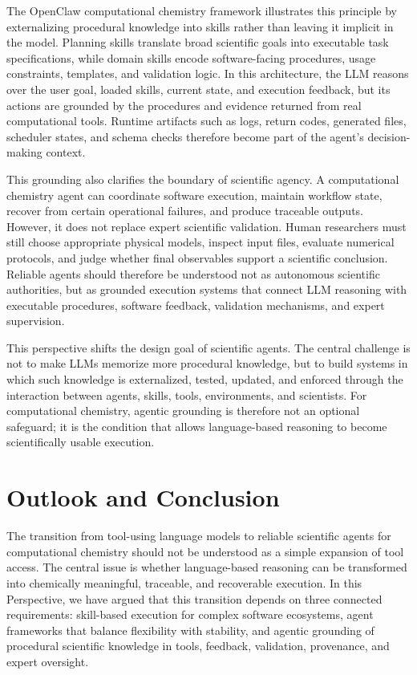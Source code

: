 \documentclass[journal=jacsat,manuscript=article]{achemso}
\begin{document}
The OpenClaw computational chemistry framework illustrates this principle by externalizing procedural knowledge into skills rather than leaving it implicit in the model. Planning skills translate broad scientific goals into executable task specifications, while domain skills encode software-facing procedures, usage constraints, templates, and validation logic. In this architecture, the LLM reasons over the user goal, loaded skills, current state, and execution feedback, but its actions are grounded by the procedures and evidence returned from real computational tools. Runtime artifacts such as logs, return codes, generated files, scheduler states, and schema checks therefore become part of the agent's decision-making context.

This grounding also clarifies the boundary of scientific agency. A computational chemistry agent can coordinate software execution, maintain workflow state, recover from certain operational failures, and produce traceable outputs. However, it does not replace expert scientific validation. Human researchers must still choose appropriate physical models, inspect input files, evaluate numerical protocols, and judge whether final observables support a scientific conclusion. Reliable agents should therefore be understood not as autonomous scientific authorities, but as grounded execution systems that connect LLM reasoning with executable procedures, software feedback, validation mechanisms, and expert supervision.

This perspective shifts the design goal of scientific agents. The central challenge is not to make LLMs memorize more procedural knowledge, but to build systems in which such knowledge is externalized, tested, updated, and enforced through the interaction between agents, skills, tools, environments, and scientists. For computational chemistry, agentic grounding is therefore not an optional safeguard; it is the condition that allows language-based reasoning to become scientifically usable execution.

\section{Outlook and Conclusion}

The transition from tool-using language models to reliable scientific agents for computational chemistry should not be understood as a simple expansion of tool access. The central issue is whether language-based reasoning can be transformed into chemically meaningful, traceable, and recoverable execution. In this Perspective, we have argued that this transition depends on three connected requirements: skill-based execution for complex software ecosystems, agent frameworks that balance flexibility with stability, and agentic grounding of procedural scientific knowledge in tools, feedback, validation, provenance, and expert oversight.
\end{document}
